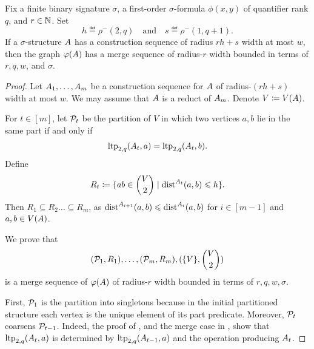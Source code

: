 \begin{lemma}\label{lem:interp}
  Fix a finite binary signature \(\sigma\), a first-order \(\sigma\)-formula
  \(\phi(x,y)\) of quantifier rank \(q\), and \(r\in\N\).
  Set
  \[
      h\eqdef \rho^-(2,q)
      \quad\text{and}\quad
      s\eqdef \rho^-(1,q+1).
  \]
  If a \(\sigma\)-structure \(\str A\) has a construction sequence of radius \(rh+s\)
  width at most \(w\), then the graph \(\phi(\str A)\) has a merge sequence of
  radius-\(r\) width bounded in terms of \(r,q,w\), and \(\sigma\).
\end{lemma}

\begin{proof}
  Let \(\str A_1,\ldots,\str A_m\) be a construction sequence for \(\str A\)
  of radius-\((rh+s)\) width at most \(w\).
  We may assume that \(\str A\) is a reduct of \(\str A_m\).
  Denote \(V\coloneqq V(\str A)\).

  For \(t\in[m]\), let \(\cal P_t\) be the partition of \(V\) in which two vertices
  \(a,b\) lie in the same part if and only if
  \[
      \ltp_{2,q}(\str A_t,a)=\ltp_{2,q}(\str A_t,b).
  \]
  Define
  \[
      R_t\coloneqq
      \setof{ab\in \binom V2}{\dist^{\str A_t}(a,b)\le h}.
  \]
Then $R_1\subseteq R_2\dots\subseteq R_m$, as $\dist^{A_{i+1}}(a,b)\le \dist^{A_{i}}(a,b)$ for $i\in[m-1]$ and $a,b\in V(\str A)$.

  We prove that
  \begin{align}\label{eq:new-merege-seq}
      (\cal P_1,R_1),\ldots,(\cal P_m,R_m),(\{V\},\binom V2)
  \end{align}
  is a merge sequence of \(\phi(\str A)\) of radius-\(r\) width bounded in terms of
  \(r,q,w,\sigma\).

  
  First, \(\cal P_1\) is the partition into singletons because in the initial
  partitioned structure each vertex is the unique element of its part predicate.
  Moreover, \(\cal P_t\) coarsens \(\cal P_{t-1}\).  Indeed, the proof of
  , and the merge case in ,
  show that \(\ltp_{2,q}(\str A_t,a)\) is determined by
  \(\ltp_{2,q}(\str A_{t-1},a)\) and the operation producing \(\str A_t\).


\end{proof}

